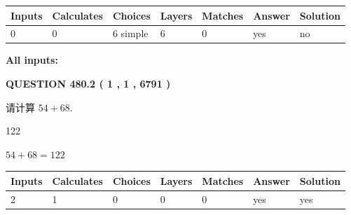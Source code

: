 \documentclass{ctexart}
\begin{document}
   
\noindent\begin{tabular}{|l|l|l|l|l|l|l|}
 \hline
Inputs & Calculates & Choices & Layers & Matches & Answer & Solution \\ \hline
 0  & 
 0  & 
 6
  simple  
  & 
 6  & 
 0  & 
  yes & 
  no 
  \\ \hline
 \end{tabular}
   
   
   
   
\noindent{}
   
   
   
   
\noindent\vspace{0.1in}\hspace{-0.08in} {\textbf{\Large{All inputs: }}}
   
   
  
\vspace{0.2in}
  
{\textbf{\Large{QUESTION
480.2 
 ( 1 , 1 , 6791 )
}}}
  
  
 
请计算 $ %
54 +  %
68 $.
 
 
 
\noindent{}
 
 

122
 
 
\noindent{}
 
 

 
 
 
\noindent{}
 
 

$ %
54 +  %
68=   %
122$
 
 
\noindent{}
 
 

 
   
   
   
   
\noindent\begin{tabular}{|l|l|l|l|l|l|l|}
 \hline
Inputs & Calculates & Choices & Layers & Matches & Answer & Solution \\ \hline
 2  & 
 1  & 
 0
  & 
 0  & 
 0  & 
  yes & 
  yes 
  \\ \hline
 \end{tabular}
   
\end{document}
